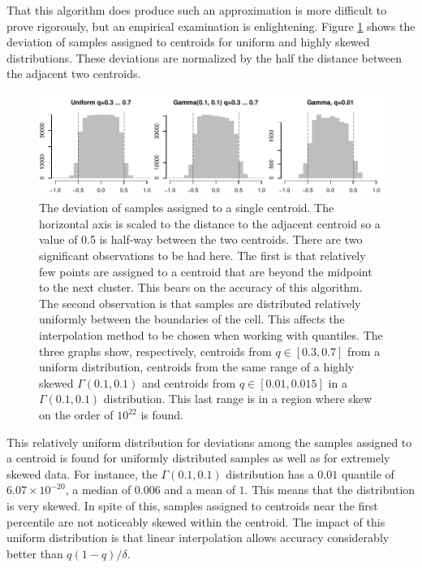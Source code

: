 \documentclass[11pt]{amsart}
\begin{document}
That this algorithm does produce such an approximation is more difficult to prove rigorously, but an empirical examination is enlightening.  Figure \ref{fig:deviation} shows the deviation of samples assigned to centroids for uniform and highly skewed distributions.  These deviations are normalized by the half the distance between the adjacent two centroids.
\begin{figure}[htb] %
   \centering
   \includegraphics[width=6in]{deviation.pdf} 
   \caption{The deviation of samples assigned to a single centroid.  The horizontal axis is scaled to the distance to the adjacent centroid so a value of 0.5 is half-way between the two centroids. There are two significant observations to be had here.  The first is that relatively few points are assigned to a centroid that are beyond the midpoint to the next cluster.  This bears on the accuracy of this algorithm.  The second observation is that samples are distributed relatively uniformly between the boundaries of the cell.  This affects the interpolation method to be chosen when working with quantiles. The three graphs show, respectively, centroids from $q \in [0.3, 0.7]$ from a uniform distribution, centroids from the same range of a highly skewed $\Gamma(0.1, 0.1)$ and centroids from $q \in [0.01, 0.015]$ in a $\Gamma(0.1, 0.1)$ distribution.  This last range is in a region where skew on the order of $10^{22}$ is found. }
   \label{fig:deviation}
\end{figure}
This relatively uniform distribution for deviations among the samples assigned to a centroid is found for uniformly distributed samples as well as for extremely skewed data.  For instance, the $\Gamma(0.1, 0.1)$ distribution has a $0.01$ quantile of $6.07 \times 10^{-20}$, a median of $0.006$ and a mean of $1$.  This means that the distribution is very skewed.  In spite of this, samples assigned to centroids near the first percentile are not noticeably skewed within the centroid.  The impact of this uniform distribution is that linear interpolation allows accuracy considerably better than $q(1-q)/\delta$.
\end{document}
